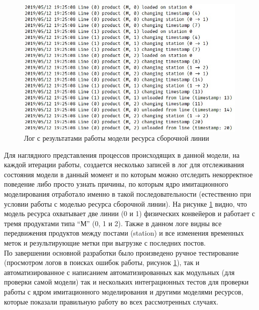 \begin{figure}[ht]
	\centering
	\includegraphics[width=\linewidth]{pics/assemblyResult.png}
	\caption{Лог с результатами работы модели ресурса сборочной линии}
	\label{fig:lineResult}
\end{figure}

\indent Для наглядного представления процессов происходящих в данной модели, на каждой итерации работы, создается несколько записей в лог для отслеживания состояния модели в данный момент и по которым можно отследить некорректное поведение либо просто узнать причины, по которым ядро имитационного моделирования отработало именно в такой последовательности (естественно при условии работы с моделью ресурса сборочной линии).
На рисунке \ref{fig:lineResult} видно, что модель ресурса охватывает две линии (0 и 1) физических конвейеров и работает с тремя продуктами типа ``М'' (0, 1 и 2).
Также в данном логе видны все передвижения продуктов между постами (station) и все изменения временных меток и результирующие метки при выгрузке с последних постов.\\
\indent По завершении основной разработки было произведено ручное тестирование (просмотром логов в поисках ошибок работы, рисунок \ref{fig:lineResult}), так и автоматизированное с написанием автоматизированных как модульных (для проверки самой модели) так и нескольких интеграционных тестов для проверки работы с ядром имитационного моделирования и другими моделями ресурсов, которые показали правильную работу во всех рассмотренных случаях.
